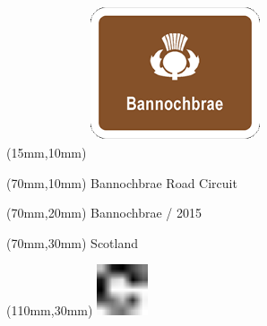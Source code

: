 \null\newpage
\begin{textblock*}{50mm}(15mm,10mm)%
\includegraphics[width=50mm]{LG/BAN.png}
\end{textblock*}
\begin{textblock*}{130mm}(70mm,10mm)%
{\fontsize{20}{20}\selectfont Bannochbrae Road Circuit}\\
\end{textblock*}
\begin{textblock*}{120mm}(70mm,20mm)%
{\fontsize{16}{16}\selectfont Bannochbrae / 2015}\\
\end{textblock*}
\begin{textblock*}{120mm}(70mm,30mm)%
{\fontsize{12}{12}\selectfont Scotland}
\end{textblock*}
\begin{textblock*}{30mm}(110mm,30mm)%
\centering
\includegraphics[height=15mm]{icons/fa-rotate-right.pdf}
\end{textblock*}
